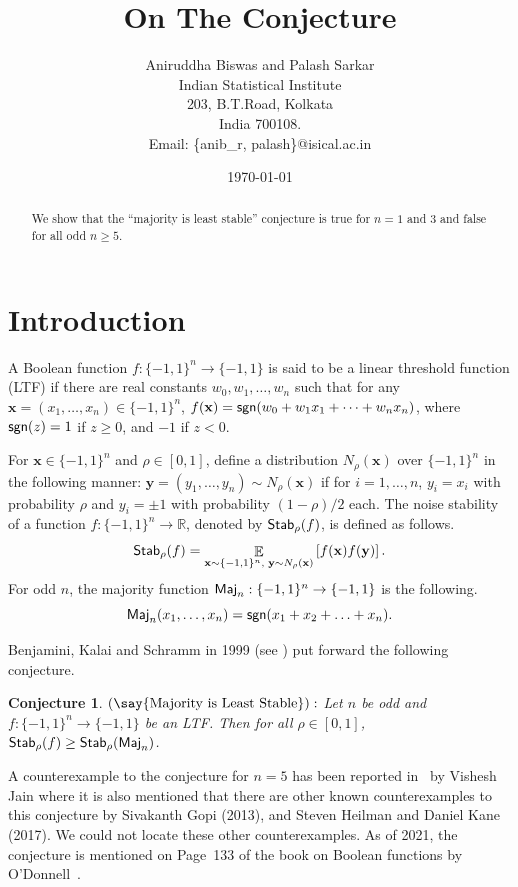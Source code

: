 \documentclass[11pt]{article}
\title{On The \say{Majority is Least stable} Conjecture} %
\author{Aniruddha Biswas and Palash Sarkar \\
Indian Statistical Institute \\
203, B.T.Road, Kolkata \\
India 700108. \\
Email: \{anib\_r, palash\}@isical.ac.in
}
\date{\today}
\newtheorem{conjecture}{Conjecture}
\newcommand{\sym}[1]{{\sf #1}}
\begin{document}
\maketitle

\begin{abstract}
We show that the ``majority is least stable'' conjecture is true for $n=1$ and $3$ and false for all odd $n\geq 5$. 
\end{abstract}
\section{Introduction}
A Boolean function $f:\{-1,1\}^n\rightarrow \{-1,1\}$ is said to be a linear threshold function (LTF) if there are real constants $w_0,w_1,\ldots,w_n$ such that for 
any $\mathbf{x}=(x_1,\ldots,x_n)\in\{-1,1\}^n$, $f(\mathbf{x})=\sym{sgn}(w_0+w_1x_1+\cdots+w_nx_n)$, where $\sym{sgn}(z) = 1$ if $z \geq 0$, and $-1$ if $z < 0$. 

For $\mathbf{x}\in\{-1,1\}^n$ and $\rho\in[0,1]$, define a distribution $N_{\rho}(\mathbf{x})$ over $\{-1,1\}^n$ in the following manner:
$\mathbf{y}=(y_1,\ldots,y_n)\sim N_{\rho}(\mathbf{x})$ if for $i=1,\ldots,n$, $y_i=x_i$ with probability $\rho$ and $y_i=\pm1$ with probability $(1-\rho)/2$ each.
The noise stability of a function $f:\{-1,1\}^n\rightarrow\mathbb{R}$, denoted by $\sym{Stab}_{\rho}(f)$, is defined as follows.
\begin{equation*}
 \sym{Stab}_{\rho}(f)=\mathop{\mathbb{E}}_{\mathbf{x}\sim\{-1,1\}^n\text{, }\mathbf{y}\sim N_{\rho}(\mathbf{x})}\left[f(\mathbf{x})f(\mathbf{y})\right].
\end{equation*}
For odd $n$, the majority function $\sym{Maj}_n:\{-1,1\}^n \rightarrow \{-1,1\}$ is the following.
\begin{equation*}
 \sym{Maj}_n(x_1,\ldots,x_n)=\sym{sgn}(x_1 + x_2 + \ldots + x_n).
\end{equation*}

Benjamini, Kalai and Schramm in 1999 (see \cite{benjamini1999noise,filmus2014real}) put forward the following conjecture.
\begin{conjecture}\label{conjecture_1}
$\left(\text{\say{Majority is Least Stable}}\right):$ Let $n$ be odd and $f : \{-1, 1\}^n \rightarrow \{- 1, 1\}$ be an LTF. Then for all $\rho\in[0,1]$, $\sym{Stab}_{\rho}(f)\geq \sym{Stab}_{\rho}(\sym{Maj}_{n})$.
\end{conjecture}
A counterexample to the conjecture for $n=5$ has been reported in~\cite{jain2017counterexample} by Vishesh Jain where it is also mentioned that there are 
other known counterexamples to this conjecture by Sivakanth Gopi (2013), and Steven Heilman and Daniel Kane (2017). We could not locate these other counterexamples.
As of 2021, the conjecture is mentioned on Page~133 of the book on Boolean functions by O'Donnell~\cite{o2014analysis}.
\end{document}
